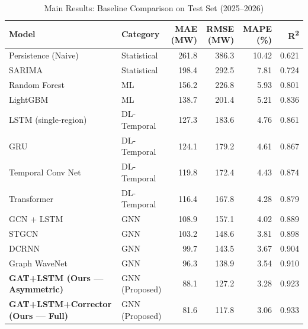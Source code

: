 \begin{table}[t]
\centering
\caption{Main Results: Baseline Comparison on Test Set (2025–2026)}
\label{tab:baselines}
\begin{tabular}{@{}llrrrr@{}}\toprule
Model & Category & MAE (MW) & RMSE (MW) & MAPE (\%) & R\textsuperscript{2} \\ \midrule
Persistence (Naive) & Statistical & 261.8 & 386.3 & 10.42 & 0.621 \\
SARIMA & Statistical & 198.4 & 292.5 & 7.81 & 0.724 \\
\midrule
Random Forest & ML & 156.2 & 226.8 & 5.93 & 0.801 \\
LightGBM & ML & 138.7 & 201.4 & 5.21 & 0.836 \\
\midrule
LSTM (single-region) & DL-Temporal & 127.3 & 183.6 & 4.76 & 0.861 \\
GRU & DL-Temporal & 124.1 & 179.2 & 4.61 & 0.867 \\
Temporal Conv Net & DL-Temporal & 119.8 & 172.4 & 4.43 & 0.874 \\
Transformer & DL-Temporal & 116.4 & 167.8 & 4.28 & 0.879 \\
\midrule
GCN + LSTM & GNN & 108.9 & 157.1 & 4.02 & 0.889 \\
STGCN & GNN & 103.2 & 148.6 & 3.81 & 0.898 \\
DCRNN & GNN & 99.7 & 143.5 & 3.67 & 0.904 \\
Graph WaveNet & GNN & 96.3 & 138.9 & 3.54 & 0.910 \\
\midrule
\textbf{GAT+LSTM (Ours — Asymmetric)} & GNN (Proposed) & 88.1 & 127.2 & 3.28 & 0.923 \\
\textbf{GAT+LSTM+Corrector (Ours — Full)} & GNN (Proposed) & 81.6 & 117.8 & 3.06 & 0.933 \\
\bottomrule
\end{tabular}
\end{table}
